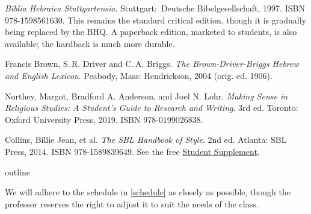 \documentclass[titlepage]{article}
\begin{document}
\begingroup
\renewcommand{\section}[2]{}%
\begin{thebibliography}{Making Sense}%

    \emph{Biblia Hebraica Stuttgartensia}.
    Stuttgart: Deutsche Bibel\-ge\-sell\-schaft, 1997. ISBN 978-1598561630.
    This remains the standard critical edition, though it is gradually
    being replaced by the BHQ. A paperback edition, marketed to
    students, is also available; the hardback is much more durable.

    Francis Brown, S.\,R. Driver and C.\,A. Briggs. \emph{The
    Brown-Driver-Briggs Hebrew and English Lexicon}. Peabody, Mass:
    Hendrickson, 2004 (orig. ed. 1906).

	 Northey, Margot, Bradford A. Anderson, and Joel N. Lohr.
	\emph{Making Sense in Religious Studies: A Student's Guide to Research and Writing}.
	3rd ed. Toronto: Oxford University Press, 2019. ISBN 978-0199026838.

	 Collins, Billie Jean, et al.
	\emph{The SBL Handbook of Style}.
	2nd ed. Atlanta: SBL Press, 2014. ISBN 978-1589839649. See the free
	\href{https://www.sbl-site.org/wp-content/uploads/2025/04/SBLHSsupp2015-02.pdf}{Student Supplement}.

\end{thebibliography}
\endgroup


\section{Course Outline}
\label{outline}

We will adhere to the schedule in \autoref{schedule} as closely as
possible, though the professor reserves the right to adjust it to suit
the needs of the class.
\end{document}
